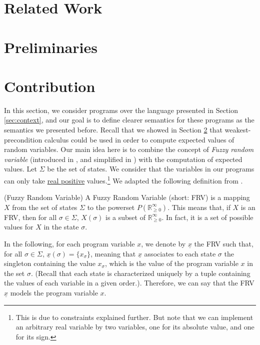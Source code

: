 \documentclass[a4paper,10pt]{llncs}
\def\RRposi {{\mathbb R_{\geq 0}^{\infty}}}
\begin{document}
\section{Related Work}
\label{sec:related}

\section{Preliminaries}
\label{sec:preliminaries}

\section{Contribution}
\label{sec:contribution}

In this section, we consider programs over the language presented in Section \ref{sec:context}, and our goal is to define clearer semantics for these programs as the semantics we presented before. Recall that we showed in Section \ref{sec:preliminaries} that weakest-precondition calculus could be used in order to compute expected values of random variables. Our main idea here is to combine the concept of \textit{Fuzzy random variable} (introduced in \cite{PuriRal86}, and simplified in \cite{Shapiro09}) with the computation of expected values.\newline
Let $\Sigma$ be the set of states. We consider that the variables in our programs can only take \underline{real positive} values.\footnote{This is due to constraints explained further. But note that we can implement an arbitrary real variable by two variables, one for its absolute value, and one for its sign.} We adapted the following definition from \cite{PuriRal86}.

\begin{definition}{\textnormal{(Fuzzy Random Variable)\newline}}
 A Fuzzy Random Variable (short: FRV) is a mapping $X$ from the set of states $\Sigma$ to the powerset $P(\RRposi)$. This means that, if $X$ is an FRV, then for all $\sigma \in \Sigma$, $X(\sigma)$ is a subset of $\RRposi$. In fact, it is a set of possible values for $X$ in the state $\sigma$.
\end{definition}
\begin{example}
 In the following, for each program variable $x$, we denote by $\underline{x}$ the FRV such that, for all $\sigma \in \Sigma$, $\underline{x}(\sigma) = \{ x_{\sigma} \}$, meaning that $\underline{x}$ associates to each state $\sigma$ the singleton containing the value $x_\sigma$, which is the value of the program variable $x$ in the set $\sigma$. (Recall that each state is characterized uniquely by a tuple containing the values of each variable in a given order.). Therefore, we can say that the FRV $\underline{x}$ models the program variable $x$.
\end{example}
\end{document}
